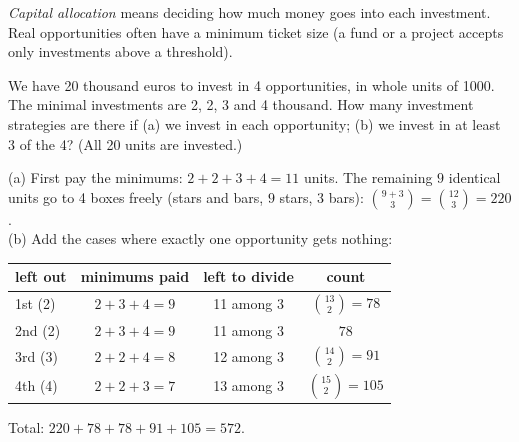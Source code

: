 
\begin{problem}
	\begin{context}
		\emph{Capital allocation} means deciding how much money goes into
		each investment. Real opportunities often have a minimum ticket size (a
		fund or a project accepts only investments above a threshold).
	\end{context}
	We have 20 thousand euros to invest in 4 opportunities, in whole units of
	1000. The minimal investments are 2, 2, 3 and 4 thousand. How many
	investment strategies are there if (a) we invest in each opportunity;
	(b) we invest in at least 3 of the 4? (All 20 units are invested.)
\end{problem}

\begin{slides}
	\small
	\exstatement
	\pause
	\sol (a) First pay the minimums: $2+2+3+4=11$ units. The remaining $9$
	identical units go to 4 boxes freely (stars and bars, $9$ stars, $3$ bars):
	$\binom{9+3}{3}=\binom{12}{3} = 220$.\\[1mm]
	(b) Add the cases where exactly one opportunity gets nothing:\par\smallskip
	{\centering
		\begin{tabular}{lccc}\toprule
			left out & minimums paid & left to divide & count               \\\midrule
			1st (2)  & $2+3+4=9$     & 11 among 3     & $\binom{13}{2}=78$  \\
			2nd (2)  & $2+3+4=9$     & 11 among 3     & $78$                \\
			3rd (3)  & $2+2+4=8$     & 12 among 3     & $\binom{14}{2}=91$  \\
			4th (4)  & $2+2+3=7$     & 13 among 3     & $\binom{15}{2}=105$ \\\bottomrule
		\end{tabular}\par}\smallskip
	Total: $220+78+78+91+105 = 572$.
\end{slides}

